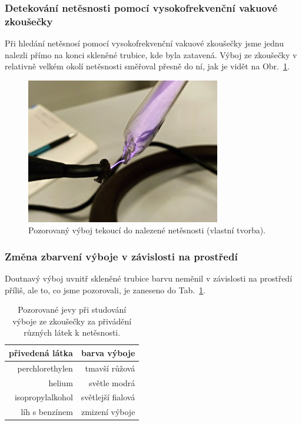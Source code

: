\documentclass[english]{article}
\begin{document}
		\subsubsection{Detekování netěsnosti pomocí vysokofrekvenční vakuové zkoušečky}
			Při hledání netěsnosí pomocí vysokofrekvenční vakuové zkoušečky jsme jednu nalezli přímo na konci skleněné trubice, kde byla zatavená. Výboj ze zkoušečky v relativně velkém okolí netěsnosti směřoval přesně do ní, jak je vidět na Obr.~\ref{fig:f_vyboj}. 
			
			\begin{figure} %
						\centering
						\includegraphics[width=8.5cm]{../att/vyboj}
						\caption{Pozorovaný výboj tekoucí do nalezené netěsnosti (vlastní tvorba).}
						\label{fig:f_vyboj}
			\end{figure}
		
		\subsubsection{Změna zbarvení výboje v závislosti na prostředí}
			Doutnavý výboj uvnitř skleněné trubice barvu neměnil v závislosti na prostředí příliš, ale to, co jsme pozorovali, je zaneseno do Tab.~\ref{tab:barvy}.
			
\begin{table}[htbp]
  \centering
    \begin{tabular}{|r|r|}
    \hline
    \textbf{přivedená látka} & \textbf{barva výboje} \bigstrut\\
    \hline
    perchlorethylen & tmavší růžová \bigstrut\\
    \hline
    helium & světle modrá \bigstrut\\
    \hline
    isopropylalkohol & světlejší fialová \bigstrut\\
    \hline
    líh s benzínem & zmizení výboje \bigstrut\\
    \hline
    \end{tabular}%
  \caption{Pozorované jevy při studování výboje ze zkoušečky za přivádění různých látek k netěsnosti.}
  \label{tab:barvy}%
\end{table}%
			
\end{document}
